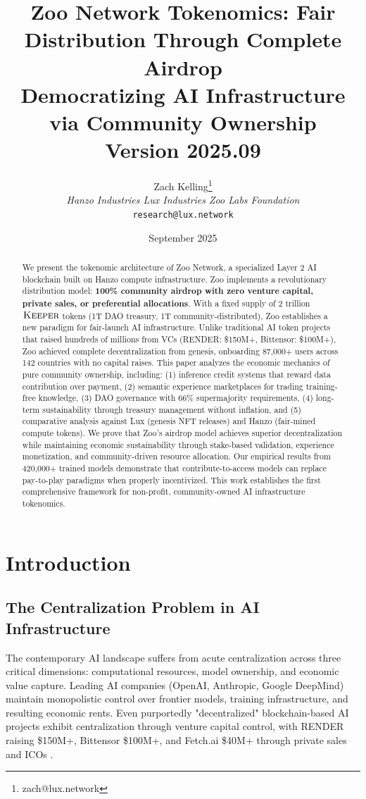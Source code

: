 \documentclass[11pt,letterpaper]{article}
\title{\textbf{Zoo Network Tokenomics: Fair Distribution Through Complete Airdrop}\\
\large Democratizing AI Infrastructure via Community Ownership\\
\vspace{5pt}
\normalsize Version 2025.09}
\author{
Zach Kelling\thanks{zach@lux.network}\\
\textit{Hanzo Industries \quad Lux Industries \quad Zoo Labs Foundation}\\
\texttt{research@lux.network}
}
\date{September 2025}
\theoremstyle{definition}
\theoremstyle{remark}
\newcommand{\KEEPER}{\textsc{Keeper}}
\begin{document}
\zoocoverpage

\begin{abstract}
We present the tokenomic architecture of Zoo Network, a specialized Layer 2 AI blockchain built on Hanzo compute infrastructure. Zoo implements a revolutionary distribution model: \textbf{100\% community airdrop with zero venture capital, private sales, or preferential allocations}. With a fixed supply of 2 trillion $\KEEPER$ tokens (1T DAO treasury, 1T community-distributed), Zoo establishes a new paradigm for fair-launch AI infrastructure. Unlike traditional AI token projects that raised hundreds of millions from VCs (RENDER: \$150M+, Bittensor: \$100M+), Zoo achieved complete decentralization from genesis, onboarding 87,000+ users across 142 countries with no capital raises. This paper analyzes the economic mechanics of pure community ownership, including: (1) inference credit systems that reward data contribution over payment, (2) semantic experience marketplaces for trading training-free knowledge, (3) DAO governance with 66\% supermajority requirements, (4) long-term sustainability through treasury management without inflation, and (5) comparative analysis against Lux (genesis NFT releases) and Hanzo (fair-mined compute tokens). We prove that Zoo's airdrop model achieves superior decentralization while maintaining economic sustainability through stake-based validation, experience monetization, and community-driven resource allocation. Our empirical results from 420,000+ trained models demonstrate that contribute-to-access models can replace pay-to-play paradigms when properly incentivized. This work establishes the first comprehensive framework for non-profit, community-owned AI infrastructure tokenomics.
\end{abstract}

\tableofcontents
\newpage

\section{Introduction}

\subsection{The Centralization Problem in AI Infrastructure}

The contemporary AI landscape suffers from acute centralization across three critical dimensions: computational resources, model ownership, and economic value capture. Leading AI companies (OpenAI, Anthropic, Google DeepMind) maintain monopolistic control over frontier models, training infrastructure, and resulting economic rents. Even purportedly "decentralized" blockchain-based AI projects exhibit centralization through venture capital control, with RENDER raising \$150M+, Bittensor \$100M+, and Fetch.ai \$40M+ through private sales and ICOs \cite{messari2024ai, coindesk2024render}.
\end{document}
